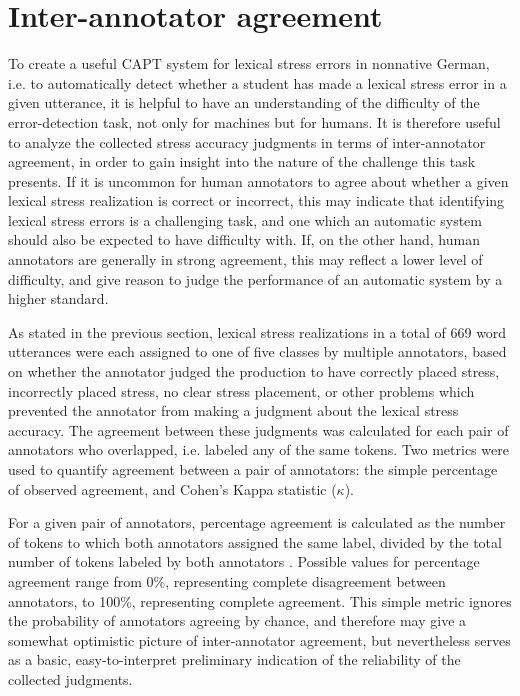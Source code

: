 		
	
	\section{Inter-annotator agreement}
	\label{sec:lexstress:agreement}	
	
	To create a useful CAPT system for lexical stress errors in nonnative German, i.e. to automatically detect whether a student has made a lexical stress error in a given utterance, it is helpful to have an understanding of the difficulty of the error-detection task, not only for machines but for humans. It is therefore useful to analyze the collected stress accuracy judgments in terms of inter-annotator agreement, in order to gain insight into the nature of the challenge this task presents. If it is uncommon for human annotators to agree about whether a given lexical stress realization is correct or incorrect, this may indicate that  identifying lexical stress errors is a challenging task, and one which an automatic system should also be expected to have difficulty with. If, on the other hand, human annotators are generally in strong agreement, this may reflect a lower level of difficulty, and give reason to judge the performance of an automatic system by a higher standard.  
	
	As stated in the previous section,
	lexical stress realizations in a total of 669 word utterances were each assigned to one of five classes by multiple annotators, based on whether the annotator judged the production to have correctly placed stress, incorrectly placed stress, no clear stress placement, or other problems which prevented the annotator from making a judgment about the lexical stress accuracy. The agreement between these judgments was calculated for each pair of annotators who overlapped, i.e. labeled any of the same tokens. 
		Two metrics were used to quantify agreement between a pair of annotators: the simple percentage of observed agreement, and Cohen's Kappa statistic ($\kappa$). 
		
		For a given pair of annotators, percentage agreement is calculated as the number of tokens to which both annotators assigned the same label, divided by the total number of tokens labeled by both annotators . Possible values for percentage agreement range from 0\%, representing complete disagreement between annotators, to 100\%, representing complete agreement. This simple metric ignores the probability of annotators agreeing by chance, and therefore may give a somewhat optimistic picture of inter-annotator agreement, but nevertheless serves as a basic, easy-to-interpret preliminary indication of the reliability of the collected judgments.
		

